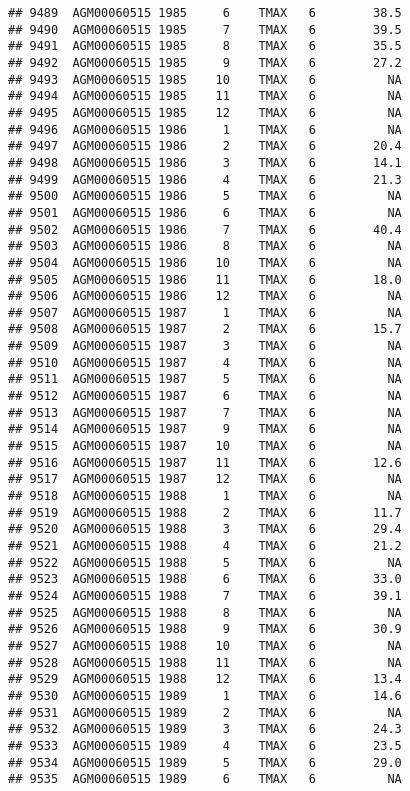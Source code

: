 \documentclass{article}\usepackage[]{graphicx}\usepackage[]{color}
\makeatletter
\newenvironment{kframe}{%
 \def\at@end@of@kframe{}%
 \ifinner\ifhmode%
  \def\at@end@of@kframe{\end{minipage}}%
  \begin{minipage}{\columnwidth}%
 \fi\fi%
 \def\FrameCommand##1{\hskip\@totalleftmargin \hskip-\fboxsep
 \colorbox{shadecolor}{##1}\hskip-\fboxsep
     \hskip-\linewidth \hskip-\@totalleftmargin \hskip\columnwidth}%
 \MakeFramed {\advance\hsize-\width
   \@totalleftmargin\z@ \linewidth\hsize
   \@setminipage}}%
 {\par\unskip\endMakeFramed%
 \at@end@of@kframe}
\newenvironment{knitrout}{}{} %
\makeatother
\begin{document}
\begin{knitrout}
\begin{kframe}
\begin{verbatim}
## 9489  AGM00060515 1985     6    TMAX   6        38.5
## 9490  AGM00060515 1985     7    TMAX   6        39.5
## 9491  AGM00060515 1985     8    TMAX   6        35.5
## 9492  AGM00060515 1985     9    TMAX   6        27.2
## 9493  AGM00060515 1985    10    TMAX   6          NA
## 9494  AGM00060515 1985    11    TMAX   6          NA
## 9495  AGM00060515 1985    12    TMAX   6          NA
## 9496  AGM00060515 1986     1    TMAX   6          NA
## 9497  AGM00060515 1986     2    TMAX   6        20.4
## 9498  AGM00060515 1986     3    TMAX   6        14.1
## 9499  AGM00060515 1986     4    TMAX   6        21.3
## 9500  AGM00060515 1986     5    TMAX   6          NA
## 9501  AGM00060515 1986     6    TMAX   6          NA
## 9502  AGM00060515 1986     7    TMAX   6        40.4
## 9503  AGM00060515 1986     8    TMAX   6          NA
## 9504  AGM00060515 1986    10    TMAX   6          NA
## 9505  AGM00060515 1986    11    TMAX   6        18.0
## 9506  AGM00060515 1986    12    TMAX   6          NA
## 9507  AGM00060515 1987     1    TMAX   6          NA
## 9508  AGM00060515 1987     2    TMAX   6        15.7
## 9509  AGM00060515 1987     3    TMAX   6          NA
## 9510  AGM00060515 1987     4    TMAX   6          NA
## 9511  AGM00060515 1987     5    TMAX   6          NA
## 9512  AGM00060515 1987     6    TMAX   6          NA
## 9513  AGM00060515 1987     7    TMAX   6          NA
## 9514  AGM00060515 1987     9    TMAX   6          NA
## 9515  AGM00060515 1987    10    TMAX   6          NA
## 9516  AGM00060515 1987    11    TMAX   6        12.6
## 9517  AGM00060515 1987    12    TMAX   6          NA
## 9518  AGM00060515 1988     1    TMAX   6          NA
## 9519  AGM00060515 1988     2    TMAX   6        11.7
## 9520  AGM00060515 1988     3    TMAX   6        29.4
## 9521  AGM00060515 1988     4    TMAX   6        21.2
## 9522  AGM00060515 1988     5    TMAX   6          NA
## 9523  AGM00060515 1988     6    TMAX   6        33.0
## 9524  AGM00060515 1988     7    TMAX   6        39.1
## 9525  AGM00060515 1988     8    TMAX   6          NA
## 9526  AGM00060515 1988     9    TMAX   6        30.9
## 9527  AGM00060515 1988    10    TMAX   6          NA
## 9528  AGM00060515 1988    11    TMAX   6          NA
## 9529  AGM00060515 1988    12    TMAX   6        13.4
## 9530  AGM00060515 1989     1    TMAX   6        14.6
## 9531  AGM00060515 1989     2    TMAX   6          NA
## 9532  AGM00060515 1989     3    TMAX   6        24.3
## 9533  AGM00060515 1989     4    TMAX   6        23.5
## 9534  AGM00060515 1989     5    TMAX   6        29.0
## 9535  AGM00060515 1989     6    TMAX   6          NA

\end{verbatim}
\end{kframe}
\end{knitrout}
\end{document}
